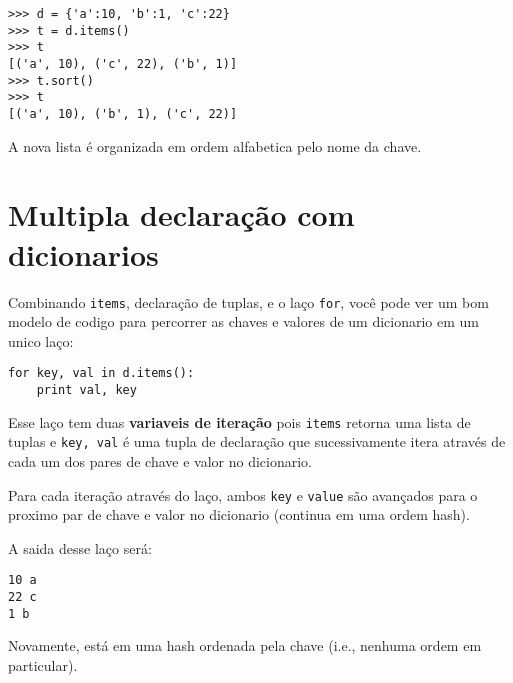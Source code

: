 \beforeverb
\begin{verbatim}
>>> d = {'a':10, 'b':1, 'c':22}
>>> t = d.items()
>>> t
[('a', 10), ('c', 22), ('b', 1)]
>>> t.sort()
>>> t
[('a', 10), ('b', 1), ('c', 22)]
\end{verbatim}
\afterverb
%
A nova lista é organizada em ordem alfabetica pelo nome da chave.

\section{Multipla declaração com dicionarios}


Combinando {\tt items}, declaração de tuplas, e o laço {\tt for}, você
pode ver um bom modelo de codigo para percorrer as chaves e valores de um
dicionario em um unico laço:

\beforeverb
\begin{verbatim}
for key, val in d.items():
    print val, key
\end{verbatim}
\afterverb
%
Esse laço tem duas {\bf variaveis de iteração} pois {\tt items} retorna
uma lista de tuplas e {\tt key, val} é uma tupla de declaração
que sucessivamente itera através de cada um dos pares de chave e valor no
dicionario.

Para cada iteração
através do laço, ambos {\tt key} e {\tt value} são avançados para o
proximo par de chave e valor no dicionario (continua em uma ordem hash).

A saida desse laço será:

\beforeverb
\begin{verbatim}
10 a
22 c
1 b
\end{verbatim}
\afterverb
%
Novamente, está em uma hash ordenada pela chave (i.e., nenhuma ordem em particular).

